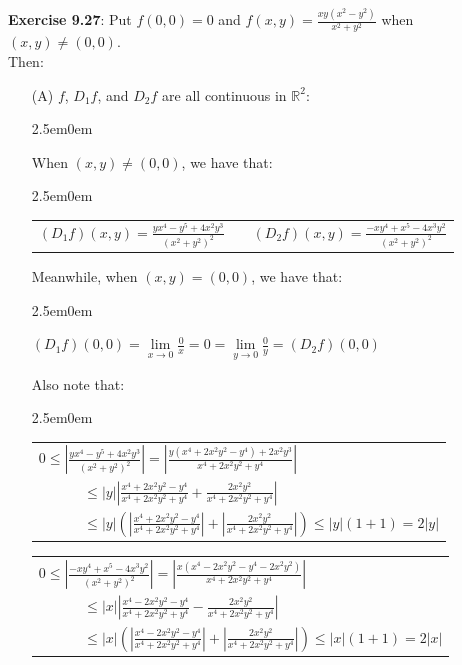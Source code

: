 \documentclass{book}
\newcommand{\exTwo}{%
   \color{RedViolet}%
   \fontsize{13}{15}\selectfont%
}
\newenvironment{myIndent}{%
   \begin{adjustwidth}{2.5em}{0em}%
}{%
   \end{adjustwidth}%
}
\newcommand{\retTwo}{\hfill\bigbreak}
\begin{document}
\textbf{Exercise 9.27}: Put $f(0, 0) = 0$ and $f(x, y) = \frac{xy(x^2-y^2)}{x^2+y^2}$ when $(x, y) \neq (0, 0)$.\\ Then:
\begin{itemize}
   \item[(A)] $f$, $D_1f$, and $D_2f$ are all continuous in $\mathbb{R}^2$:
   
   {\begin{myIndent}\exTwo
      When $(x, y) \neq (0, 0)$, we have that:
      \begin{myIndent}
         {\begin{tabular}{l c l}
            $(D_1f)(x, y) = \frac{yx^4 - y^5 + 4x^2y^3}{(x^2 + y^2)^2}$ & \quad\quad & $(D_2f)(x, y) = \frac{-xy^4 + x^5 - 4x^3y^2}{(x^2 + y^2)^2}$
         \end{tabular}}\retTwo
      \end{myIndent}

      Meanwhile, when $(x, y) = (0, 0)$, we have that:
      \begin{myIndent}
         $(D_1f)(0, 0) = \lim\limits_{x\rightarrow 0}\frac{0}{x} = 0 = \lim\limits_{y\rightarrow 0}\frac{0}{y} = (D_2f)(0, 0)$
      \end{myIndent}

      Also note that:
      \begin{myIndent}
         \begin{tabular}{l}
            $0 \leq \left|\frac{yx^4 - y^5 + 4x^2y^3}{(x^2 + y^2)^2}\right| = \left|\frac{y(x^4 + 2x^2y^2 - y^4) + 2x^2y^3}{x^4 + 2x^2y^2 + y^4}\right|$\\ [8pt]
            $\phantom{aaaaaa} \leq |y|\left|\frac{x^4 + 2x^2y^2 - y^4}{x^4 + 2x^2y^2 + y^4} + \frac{2x^2y^2}{x^4 + 2x^2y^2 + y^4}\right|$\\ [8pt]
            $\phantom{aaaaaa} \leq |y|\left(\left|\frac{x^4 + 2x^2y^2 - y^4}{x^4 + 2x^2y^2 + y^4}\right| + \left|\frac{2x^2y^2}{x^4 + 2x^2y^2 + y^4}\right|\right) \leq |y|(1 + 1) = 2|y|$
         \end{tabular}\retTwo


         \begin{tabular}{l}
            $0 \leq \left|\frac{-xy^4 + x^5 - 4x^3y^2}{(x^2 + y^2)^2}\right| = \left|\frac{x(x^4 - 2x^2y^2 - y^4  - 2x^2y^2)}{x^4 + 2x^2y^2 + y^4}\right|$\\ [8pt]
            $\phantom{aaaaaa} \leq |x|\left|\frac{x^4 - 2x^2y^2 - y^4}{x^4 + 2x^2y^2 + y^4} - \frac{2x^2y^2}{x^4 + 2x^2y^2 + y^4}\right|$\\ [8pt]
            $\phantom{aaaaaa} \leq |x|\left(\left|\frac{x^4 - 2x^2y^2 - y^4}{x^4 + 2x^2y^2 + y^4}\right| + \left|\frac{2x^2y^2}{x^4 + 2x^2y^2 + y^4}\right|\right) \leq |x|(1 + 1) = 2|x|$
         \end{tabular}\retTwo
      \end{myIndent}


\end{myIndent}}
\end{itemize}
\end{document}
